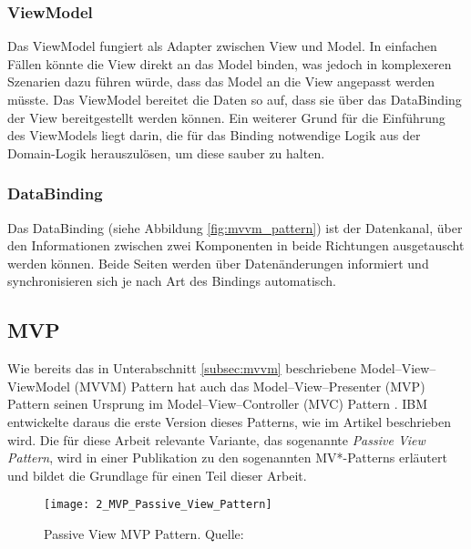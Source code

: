 \subsubsection{ViewModel}
Das ViewModel fungiert als Adapter zwischen View und Model. In einfachen Fällen könnte die View direkt an das Model binden, was jedoch in komplexeren Szenarien dazu führen würde, dass das Model an die View angepasst werden müsste. Das ViewModel bereitet die Daten so auf, dass sie über das DataBinding der View bereitgestellt werden können. 
Ein weiterer Grund für die Einführung des ViewModels liegt darin, die für das Binding notwendige Logik aus der Domain-Logik herauszulösen, um diese sauber zu halten.

\subsubsection{DataBinding}
Das DataBinding (siehe Abbildung \ref{fig:mvvm_pattern}) ist der Datenkanal, über den Informationen zwischen zwei Komponenten in beide Richtungen ausgetauscht werden können. 
Beide Seiten werden über Datenänderungen informiert und synchronisieren sich je nach Art des Bindings automatisch.

\subsection{MVP}
\label{subsec:mvp}
Wie bereits das in Unterabschnitt \ref{subsec:mvvm} beschriebene Model–View–ViewModel (MVVM) Pattern hat auch das Model–View–Presenter (MVP) Pattern seinen Ursprung im Model–View–Controller (MVC) Pattern \cite{Krasner1988MVC}. 
IBM entwickelte daraus die erste Version dieses Patterns, wie im Artikel \cite{potel1996mvp} beschrieben wird. 
Die für diese Arbeit relevante Variante, das sogenannte \textit{Passive View Pattern}, wird in einer Publikation zu den sogenannten MV*-Patterns \cite{mvp_ieee} erläutert und bildet die Grundlage für einen Teil dieser Arbeit.

\begin{figure}[H]
    \centering
    \texttt{[image: 2\_MVP\_Passive\_View\_Pattern]}
    \caption{Passive View MVP Pattern. Quelle: \cite{mvp_ieee}}
    \label{fig:mvp_pattern}
\end{figure}

